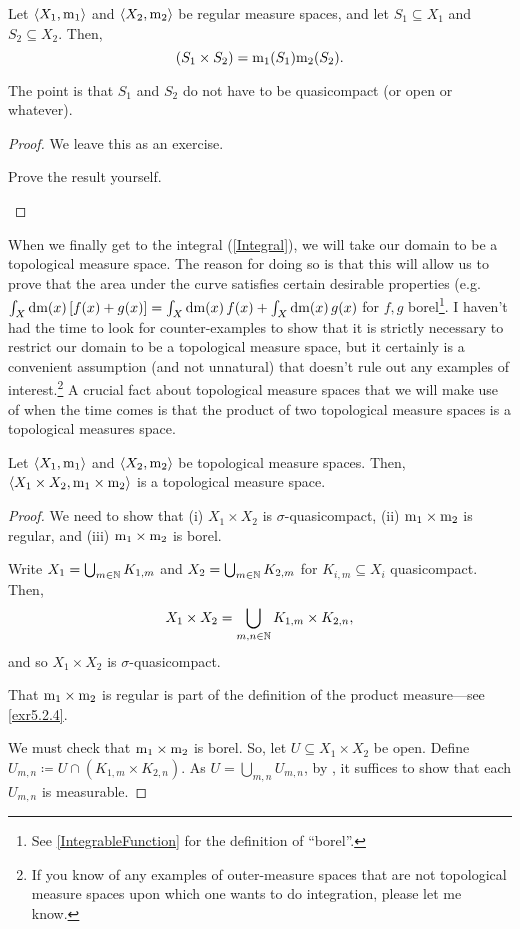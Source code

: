 \begin{prp}
Let $\langle X_1,\mathrm{m} _1\rangle$ and $\langle X_2,\mathrm{m} _2\rangle$ be regular measure spaces, and let $S_1\subseteq X_1$ and $S_2\subseteq X_2$.  Then,
\begin{equation}
[\meas _1\times \meas _2](S_1\times S_2)=\meas _1(S_1)\meas _2(S_2).
\end{equation}
\begin{rmk}
The point is that $S_1$ and $S_2$ do not have to be quasicompact (or open or whatever).
\end{rmk}
\begin{proof}
We leave this as an exercise.
\begin{exr}
Prove the result yourself.
\end{exr}
\end{proof}
\end{prp}
When we finally get to the integral (\cref{Integral}), we will take our domain to be a topological measure space.  The reason for doing so is that this will allow us to prove that the area under the curve satisfies certain desirable properties (e.g.~$\int _X\mathop{}\!\mathrm{d} \mathrm{m} (x)\, [f(x)+g(x)]=\int _X\mathop{}\!\mathrm{d} \mathrm{m} (x)\, f(x)+\int _X\mathop{}\!\mathrm{d} \mathrm{m} (x)\, g(x)$ for $f,g$ borel\footnote{See \cref{IntegrableFunction} for the definition of ``borel''.}.  I haven't had the time to look for counter-examples to show that it is strictly necessary to restrict our domain to be a topological measure space, but it certainly is a convenient assumption (and not unnatural) that doesn't rule out any examples of interest.\footnote{If you know of any examples of outer-measure spaces that are not topological measure spaces upon which one wants to do integration, please let me know.}  A crucial fact about topological measure spaces that we will make use of when the time comes is that the product of two topological measure spaces is a topological measures space.
\begin{prp}
Let $\langle X_1,\mathrm{m} _1\rangle$ and $\langle X_2,\mathrm{m} _2\rangle$ be topological measure spaces.  Then, $\langle X_1\times X_2,\mathrm{m} _1\times \mathrm{m} _2\rangle$ is a topological measure space.
\begin{proof}
We need to show that (i) $X_1\times X_2$ is $\sigma$-quasicompact, (ii) $\mathrm{m} _1\times \mathrm{m} _2$ is regular, and (iii) $\mathrm{m} _1\times \mathrm{m} _2$ is borel.

Write $X_1=\bigcup _{m\in \mathbb{N}}K_{1,m}$ and $X_2=\bigcup _{m\in \mathbb{N}}K_{2,m}$ for $K_{i,m}\subseteq X_i$ quasicompact.  Then,
\begin{equation}
X_1\times X_2=\bigcup _{m,n\in \mathbb{N}}K_{1,m}\times K_{2,n},
\end{equation}
and so $X_1\times X_2$ is $\sigma$-quasicompact.

That $\mathrm{m} _1\times \mathrm{m} _2$ is regular is part of the definition of the product measure---see \cref{exr5.2.4}.

We must check that $\mathrm{m} _1\times \mathrm{m} _2$ is borel.  So, let $U\subseteq X_1\times X_2$ be open.  Define $U_{m,n}\coloneqq U\cap (K_{1,m}\times K_{2,n})$.  As $U=\bigcup _{m,n}U_{m,n}$, by , it suffices to show that each $U_{m,n}$ is measurable.
\end{proof}
\end{prp}

